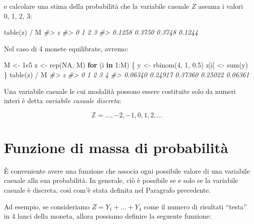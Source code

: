 \documentclass[
  11pt,
]{krantz}
\makeatletter
\newenvironment{Shaded}{\begin{snugshade}}{\end{snugshade}}
\newcommand{\CommentTok}[1]{\textcolor[rgb]{0.37,0.37,0.37}{\textit{#1}}}
\newcommand{\ConstantTok}[1]{\textcolor[rgb]{0,0,0}{#1}}
\newcommand{\ControlFlowTok}[1]{\textcolor[rgb]{0.27,0.27,0.27}{\textbf{#1}}}
\newcommand{\DecValTok}[1]{\textcolor[rgb]{0.06,0.06,0.06}{#1}}
\newcommand{\FloatTok}[1]{\textcolor[rgb]{0.06,0.06,0.06}{#1}}
\newcommand{\FunctionTok}[1]{\textcolor[rgb]{0,0,0}{#1}}
\newcommand{\NormalTok}[1]{#1}
\newcommand{\OtherTok}[1]{\textcolor[rgb]{0.37,0.37,0.37}{#1}}
\newcommand{\SpecialCharTok}[1]{\textcolor[rgb]{0,0,0}{#1}}
\newenvironment{kframe}{%
\medskip{}
\setlength{\fboxsep}{.8em}
 \def\at@end@of@kframe{}%
 \ifinner\ifhmode%
  \def\at@end@of@kframe{\end{minipage}}%
  \begin{minipage}{\columnwidth}%
 \fi\fi%
 \def\FrameCommand##1{\hskip\@totalleftmargin \hskip-\fboxsep
 \colorbox{shadecolor}{##1}\hskip-\fboxsep
     \hskip-\linewidth \hskip-\@totalleftmargin \hskip\columnwidth}%
 \MakeFramed {\advance\hsize-\width
   \@totalleftmargin\z@ \linewidth\hsize
   \@setminipage}}%
 {\par\unskip\endMakeFramed%
 \at@end@of@kframe}
\renewenvironment{Shaded}{\begin{kframe}}{\end{kframe}}
\theoremstyle{definition}
\theoremstyle{definition}
\theoremstyle{definition}
\theoremstyle{definition}
\theoremstyle{remark}
\makeatother
\begin{document}
e calcolare una stima della probabilità che la variabile casuale \(Z\) assuma i valori 0, 1, 2, 3:

\begin{Shaded}
\begin{Highlighting}[]
\FunctionTok{table}\NormalTok{(z) }\SpecialCharTok{/}\NormalTok{ M}
\CommentTok{\#\textgreater{} z}
\CommentTok{\#\textgreater{}      0      1      2      3 }
\CommentTok{\#\textgreater{} 0.1258 0.3750 0.3748 0.1244}
\end{Highlighting}
\end{Shaded}

Nel caso di 4 monete equilibrate, avremo:

\begin{Shaded}
\begin{Highlighting}[]
\NormalTok{M }\OtherTok{\textless{}{-}} \FloatTok{1e5}
\NormalTok{z }\OtherTok{\textless{}{-}} \FunctionTok{rep}\NormalTok{(}\ConstantTok{NA}\NormalTok{, M)}
\ControlFlowTok{for}\NormalTok{ (i }\ControlFlowTok{in} \DecValTok{1}\SpecialCharTok{:}\NormalTok{M) \{}
\NormalTok{  y }\OtherTok{\textless{}{-}} \FunctionTok{rbinom}\NormalTok{(}\DecValTok{4}\NormalTok{, }\DecValTok{1}\NormalTok{, }\FloatTok{0.5}\NormalTok{)}
\NormalTok{  z[i] }\OtherTok{\textless{}{-}} \FunctionTok{sum}\NormalTok{(y)}
\NormalTok{\}}
\FunctionTok{table}\NormalTok{(z) }\SpecialCharTok{/}\NormalTok{ M}
\CommentTok{\#\textgreater{} z}
\CommentTok{\#\textgreater{}       0       1       2       3       4 }
\CommentTok{\#\textgreater{} 0.06340 0.24917 0.37360 0.25022 0.06361}
\end{Highlighting}
\end{Shaded}

Una variabile casuale le cui modalità possono essere costituite solo da numeri interi è detta \emph{variabile casuale discreta}:

\[
\mathbb{Z} = \dots, -2, -1, 0, 1, 2, \dots
\]

\hypertarget{sec:fun-mass-prob}{%
\section{Funzione di massa di probabilità}\label{sec:fun-mass-prob}}

È conveniente avere una funzione che associa ogni possibile valore di una variabile casuale alla sua probabilità. In generale, ciò è possibile se e solo se la variabile casuale è discreta, così com'è stata definita nel Paragrafo precedente.

Ad esempio, se consideriamo \(Z = Y_1 + \dots + Y_4\) come il numero di risultati ``testa'' in 4 lanci della moneta, allora possiamo definire la seguente funzione:
\end{document}

